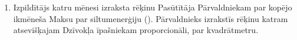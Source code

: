\begin{enumerate}

\begin{center}
\begin{tabu}{|X|X|X|X|X|X|} \tabucline{}
{{with translate "lv" .Contract.Tables.calc_energy_fee}} %
	{{.Columns | column}} \\\tabucline{}
	{{range .Headers}} {{.|row}} \\\tabucline{} {{end}} %
	{{range .Rows}} {{.|row}} \\\tabucline{} {{end}} %
	\bfseries {{total .}} \\\tabucline{} %
{{end}}
\end{tabu}
\end{center}

	\item Izpildītājs katru mēnesi izraksta rēķinu Pasūtītāja Pārvaldniekam par kopējo ikmēneša Maksu par siltumenerģiju (). Pārvaldnieks izrakstīs rēķinu katram atsevišķajam Dzīvokļa īpašniekam proporcionāli, par kvadrātmetru.
\end{enumerate}


